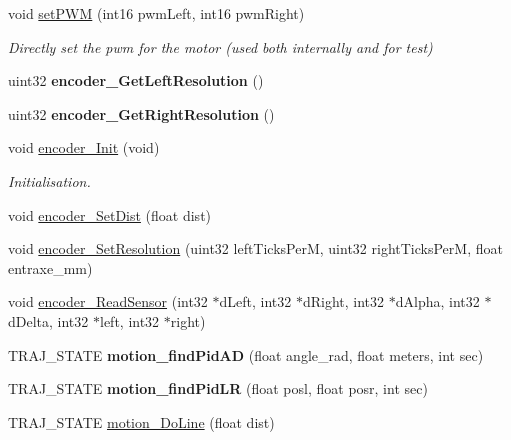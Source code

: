 \begin{DoxyCompactItemize}
void \hyperlink{classAsservInsa_a4d839cdd298a4e24f57b5a298e6f463e}{set\+P\+WM} (int16 pwm\+Left, int16 pwm\+Right)
\begin{DoxyCompactList}\small\item\em Directly set the pwm for the motor (used both internally and for test) \end{DoxyCompactList}\item 
\mbox{\label{classAsservInsa_a6bb59a9796d2339d58c36c53302cf22d}} 
uint32 {\bfseries encoder\+\_\+\+Get\+Left\+Resolution} ()
\item 
\mbox{\label{classAsservInsa_a1bdbdafa3f9edcf8632c13dffb57262a}} 
uint32 {\bfseries encoder\+\_\+\+Get\+Right\+Resolution} ()
\item 
\mbox{\label{classAsservInsa_aa20ca7b484f54748a7fefda97b969a9f}} 
void \hyperlink{classAsservInsa_aa20ca7b484f54748a7fefda97b969a9f}{encoder\+\_\+\+Init} (void)
\begin{DoxyCompactList}\small\item\em Initialisation. \end{DoxyCompactList}\item 
void \hyperlink{classAsservInsa_aca28ee0011e081ee43edc944d9dc67a3}{encoder\+\_\+\+Set\+Dist} (float dist)
\item 
void \hyperlink{classAsservInsa_a4b5dca46085bb5f955a71f5edc8374f2}{encoder\+\_\+\+Set\+Resolution} (uint32 left\+Ticks\+PerM, uint32 right\+Ticks\+PerM, float entraxe\+\_\+mm)
\item 
void \hyperlink{classAsservInsa_a76cc56c8240ee5f95dd15f4d3097f9a7}{encoder\+\_\+\+Read\+Sensor} (int32 $\ast$d\+Left, int32 $\ast$d\+Right, int32 $\ast$d\+Alpha, int32 $\ast$d\+Delta, int32 $\ast$left, int32 $\ast$right)
\item 
\mbox{\label{classAsservInsa_a6119d026aea3bd10b93a7e5443a8c764}} 
T\+R\+A\+J\+\_\+\+S\+T\+A\+TE {\bfseries motion\+\_\+find\+Pid\+AD} (float angle\+\_\+rad, float meters, int sec)
\item 
\mbox{\label{classAsservInsa_aa5cfee544774789548c1033627e2081e}} 
T\+R\+A\+J\+\_\+\+S\+T\+A\+TE {\bfseries motion\+\_\+find\+Pid\+LR} (float posl, float posr, int sec)
\item 
T\+R\+A\+J\+\_\+\+S\+T\+A\+TE \hyperlink{classAsservInsa_a3cb6f1cf5557851312a8398b79514905}{motion\+\_\+\+Do\+Line} (float dist)

\end{DoxyCompactItemize}
